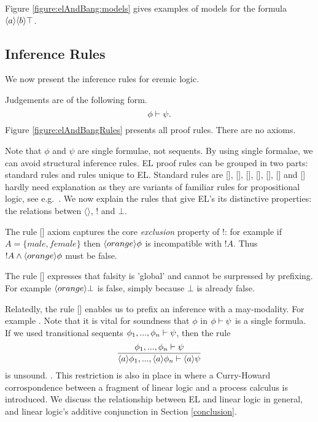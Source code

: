 \NI Figure \ref{figure:elAndBang:models} gives examples of models for
the formula $\langle a \rangle \langle b \rangle \top$. 

\subsection{Inference Rules}



\NI We now present the inference rules for eremic logic. 

\begin{definition} Judgements are of the following form.
\[
  \phi \vdash \psi.
\]
Figure \ref{figure:elAndBangRules} presents all proof rules. There are
no axioms.
\end{definition}

\NI Note that $\phi$ and $\psi$ are single formulae, not sequents.  By
using single formalae, we can avoid structural inference rules.  EL
proof rules can be grouped in two parts: standard rules and rules
unique to EL.  Standard rules are [],
[], [],
[], [],
[] and [] hardly need
explanation as they are variants of familiar rules for propositional
logic, see e.g.~\cite{TroelstraAS:basprot,vanDalenD:logstr}.  We now
explain the rules that give EL's its distinctive properties: the
relations betwen $\langle \rangle$, $!$ and $\bot$.

The rule [] axiom captures the core
\emph{exclusion} property of !: for example if $A = \{male, female\}$
then $\langle orange \rangle \phi$ is incompatible with $!A$. Thus $!A \land
\langle orange \rangle \phi$ must be false.

The rule [] expresses that falsity is 'global'
  and cannot be surpressed by prefixing. For example
  $\langle orange \rangle \bot$ is false, simply because $\bot$ is already
  false.

Relatedly, the rule [] enables us to
prefix an inference with a may-modality. For example . Note that it is vital for soundness that $\phi$ in $\phi
\vdash \psi$ is a single formula. If we used transitional sequents $\phi_1, ..., \phi_n \vdash \psi$,
then the rule
\[
   \frac{\displaystyle{ 
     \phi_1, ..., \phi_n \vdash\psi
    }}{\displaystyle{ 
     \langle a \rangle \phi_1, ..., \langle a \rangle \phi_n \vdash\langle a \rangle \psi
    }}
\]
is unsound. . This
restriction is also in place in \cite{GaySJ:typcalosp} where a
Curry-Howard corrospondence between a fragment of linear logic
\cite{GirardJY:linlog,GirardJY:protyp} and a process calculus is
introduced. We discuss the relationship between EL and linear logic in
general, and linear logic's additive conjunction in Section
\ref{conclusion}.


